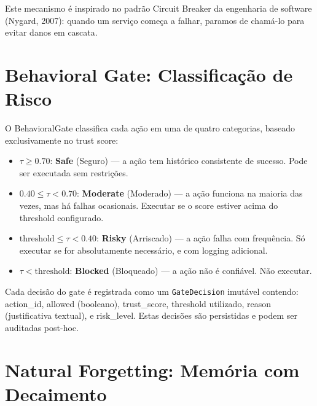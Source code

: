 Este mecanismo é inspirado no padrão Circuit Breaker da engenharia de software (Nygard, 2007): quando um serviço começa a falhar, paramos de chamá-lo para evitar danos em cascata.

\section{Behavioral Gate: Classificação de Risco}

O BehavioralGate classifica cada ação em uma de quatro categorias, baseado exclusivamente no trust score:

\begin{itemize}
    \item $\tau \geq 0.70$: \textbf{Safe} (Seguro) — a ação tem histórico consistente de sucesso. Pode ser executada sem restrições.
    \item $0.40 \leq \tau < 0.70$: \textbf{Moderate} (Moderado) — a ação funciona na maioria das vezes, mas há falhas ocasionais. Executar se o score estiver acima do threshold configurado.
    \item $\text{threshold} \leq \tau < 0.40$: \textbf{Risky} (Arriscado) — a ação falha com frequência. Só executar se for absolutamente necessário, e com logging adicional.
    \item $\tau < \text{threshold}$: \textbf{Blocked} (Bloqueado) — a ação não é confiável. Não executar.
\end{itemize}

Cada decisão do gate é registrada como um \texttt{GateDecision} imutável contendo: action\_id, allowed (booleano), trust\_score, threshold utilizado, reason (justificativa textual), e risk\_level. Estas decisões são persistidas e podem ser auditadas post-hoc.

\section{Natural Forgetting: Memória com Decaimento}


